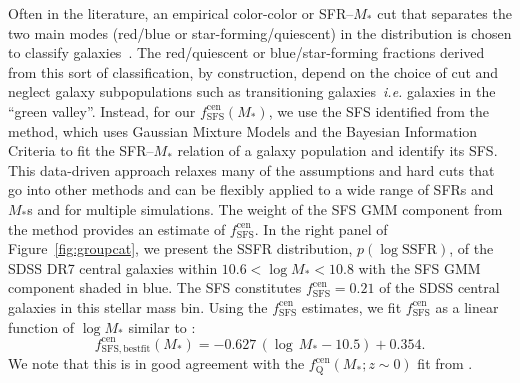 \documentclass[12pt, letterpaper, preprint, tighten]{aastex62}
\newcommand{\beq}{\begin{equation}}
\newcommand{\eeq}{\end{equation}}
\begin{document}
Often in the literature, an empirical color-color or SFR--$M_*$ cut
that separates the two main modes (red/blue or star-forming/quiescent)
in the distribution is chosen to classify
galaxies~\citep[\emph{e.g.}][]{baldry2006, blanton2009, drory2009, peng2010, moustakas2013, hahn2015}.
The red/quiescent or blue/star-forming fractions derived from this sort
of classification, by construction, depend on the choice of cut and
neglect galaxy subpopulations such as transitioning galaxies~\emph{i.e.}
galaxies in the ``green valley''. Instead, for our $f^\mathrm{cen}_\mathrm{SFS}(M_*)$,
we use the SFS identified from the \cite{hahn2018a} method, which uses Gaussian
Mixture Models and the Bayesian Information Criteria to fit the
SFR--$M_*$ relation of a galaxy population and identify its SFS. This
data-driven approach relaxes many of the assumptions and hard cuts that
go into other methods and can be flexibly applied to a wide range of SFRs 
and $M_*$s and for multiple
simulations. The weight of the SFS GMM component from the method provides
an estimate of $f^\mathrm{cen}_\mathrm{SFS}$. In the right panel of
Figure~\ref{fig:groupcat}, we present the SSFR distribution, $p(\log \mathrm{SSFR})$,
of the SDSS DR7 central galaxies within $10.6 < \log M_* < 10.8$ with
the SFS GMM component shaded in blue.
The SFS constitutes $f^\mathrm{cen}_\mathrm{SFS} = 0.21$ of the SDSS
central galaxies in this stellar mass bin. Using the $f^\mathrm{cen}_\mathrm{SFS}$
estimates, we fit $f^\mathrm{cen}_\mathrm{SFS}$ as a linear function of
$\log M_*$ similar to \cite{wetzel2013,hahn2017b}:
\beq \label{eq:f_cen_sfms}
f^\mathrm{cen}_\mathrm{SFS, bestfit}(M_*) = -0.627\,(\log\,M_* - 10.5) + 0.354.
\eeq
We note that this is in good agreement with the $f_\mathrm{Q}^\mathrm{cen}(M_*; z \sim 0)$
fit from \cite{hahn2017b}.
\end{document}
